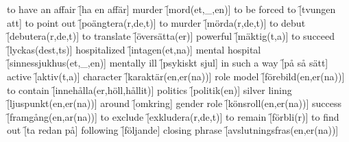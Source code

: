 \begin{questions}
\begin{multicols}{2}
        \question to have an affair \f[ha en affär]
        \question murder \f[mord(et,\_,en)]
        \question to be forced to \f[tvungen att]
        \question to point out \f[poängtera(r,de,t)]
        \question to murder \f[mörda(r,de,t)]
        \question to debut \f[debutera(r,de,t)]
        \question to translate \f[översätta(er)]
        \question powerful \f[mäktig(t,a)]
        \question to succeed \f[lyckas(dest,ts)]
        \question hospitalized \f[intagen(et,na)]
        \question mental hospital \f[sinnessjukhus(et,\_,en)]
        \question mentally ill \f[psykiskt sjul]
        \question in such a way \f[på så sätt]
        \question active \f[aktiv(t,a)]
        \question character \f[karaktär(en,er(na))]
        \question role model \f[förebild(en,er(na))]
        \question to contain \f[innehålla(er,höll,hållit)]
        \question politics \f[politik(en)]
        \question silver lining \f[ljuspunkt(en,er(na))]
        \question around \f[omkring]
        \question gender role \f[könsroll(en,er(na))]
        \question success \f[framgång(en,ar(na))]
        \question to exclude \f[exkludera(r,de,t)]
        \question to remain \f[förbli(r)]
        \question to find out \f[ta redan på]
        \question following \f[följande]
        \question closing phrase \f[avslutningsfras(en,er(na))]
    \end{multicols}
\end{questions}
